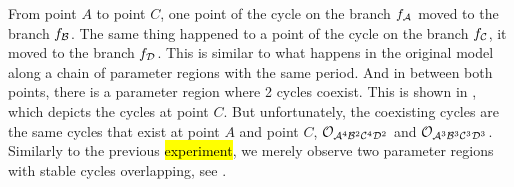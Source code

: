 From point $A$ to point $C$, one point of the cycle on the branch $f_{\mathcal{A}}$ moved to the branch $f_{\mathcal{B}}$.
The same thing happened to a point of the cycle on the branch $f_{\mathcal{C}}$, it moved to the branch $f_{\mathcal{D}}$.
This is similar to what happens in the original model along a chain of parameter regions with the same period.
And in between both points, there is a parameter region where 2 cycles coexist.
This is shown in , which depicts the cycles at point $C$.
But unfortunately, the coexisting cycles are the same cycles that exist at point $A$ and point $C$, $\mathcal{O}_{\mathcal{A}^4\mathcal{B}^2\mathcal{C}^4\mathcal{D}^2}$ and $\mathcal{O}_{\mathcal{A}^3\mathcal{B}^3\mathcal{C}^3\mathcal{D}^3}$.
Similarly to the previous \hl{experiment}, we merely observe two parameter regions with stable cycles overlapping, see .
